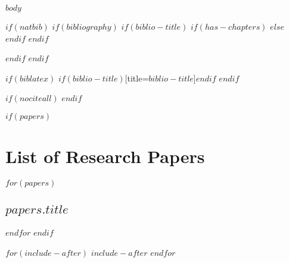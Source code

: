 \documentclass[11pt,twoside,openright,titlepage,
  headinclude,footinclude,BCOR=5mm,
  numbers=noenddot,cleardoublepage=empty,
  tablecaptionabove, dottedtoc,
  bibliography=totoc]{scrreprt}
\begin{document}
\cleardoublepage



$body$

$if(natbib)$
$if(bibliography)$
$if(biblio-title)$
$if(has-chapters)$
  \renewcommand\bibname{$biblio-title$}
$else$
  \renewcommand\refname{$biblio-title$}
$endif$ %
$endif$ %
  
$endif$ %
$endif$ %

$if(biblatex)$
\printbibliography$if(biblio-title)$[title=$biblio-title$]$endif$
$endif$ %

$if(nociteall)$
\nocite{*}
$endif$

\appendix
$if(papers)$
\part*{List of Research Papers}
$for(papers)$
\par\chapter{$papers.title$}
\cleardoublepage

$endfor$
$endif$

$for(include-after)$
$include-after$
$endfor$
\end{document}
